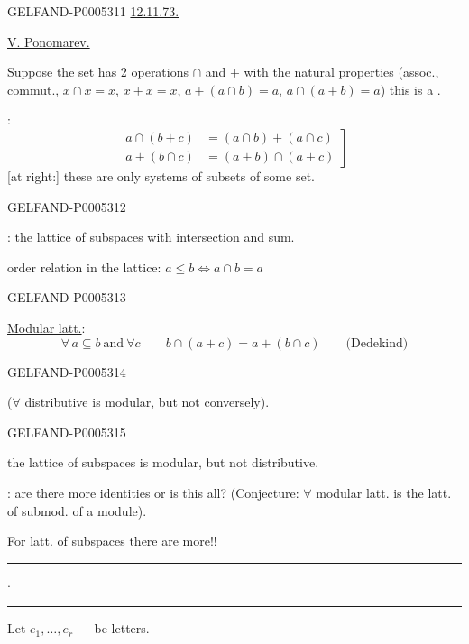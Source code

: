 \begin{GelfandAdjacentEvidence}{GELFAND-P000531}{1}
\uline{12.11.73.}\qquad{}

\uline{V. Ponomarev.}

Suppose the set has 2 operations $\cap$ and $+$ with the natural properties
(assoc., commut., $x\cap x=x$, $x+x=x$, $a+(a\cap b)=a$, $a\cap(a+b)=a$)
this is a .

:
\[
\left.\begin{aligned}
a\cap(b+c)&=(a\cap b)+(a\cap c)\\
a+(b\cap c)&=(a+b)\cap(a+c)
\end{aligned}\right]
\]
[at right:] these are only systems of subsets of some set.
\end{GelfandAdjacentEvidence}
\begin{GelfandAdjacentEvidence}{GELFAND-P000531}{2}


: the lattice of subspaces with intersection and sum.

order relation in the lattice: $a\le b\Longleftrightarrow a\cap b=a$
\end{GelfandAdjacentEvidence}
\begin{GelfandAdjacentEvidence}{GELFAND-P000531}{3}


\uline{Modular latt.}:
\[
\forall\,a\subseteq b\ \text{and}\ \forall c\qquad
b\cap(a+c)=a+(b\cap c)\qquad \text{(Dedekind)}
\]
\end{GelfandAdjacentEvidence}
\begin{GelfandAdjacentEvidence}{GELFAND-P000531}{4}


(\sout{\mbox{$\forall$}} distributive is modular, but not conversely).
\end{GelfandAdjacentEvidence}
\begin{GelfandAdjacentEvidence}{GELFAND-P000531}{5}


the lattice of subspaces is modular, but not distributive.


: are there more identities or is this all?
(Conjecture: $\forall$ modular latt. is the latt. of submod. of a module).

For latt. of subspaces \uline{there are more!!}

\hfill\rule{.9cm}{.35pt}\enspace\(\cdot\)\enspace\rule{1cm}{.35pt}\par

Let $e_1,\ldots,e_r$ — be letters.
\end{GelfandAdjacentEvidence}
